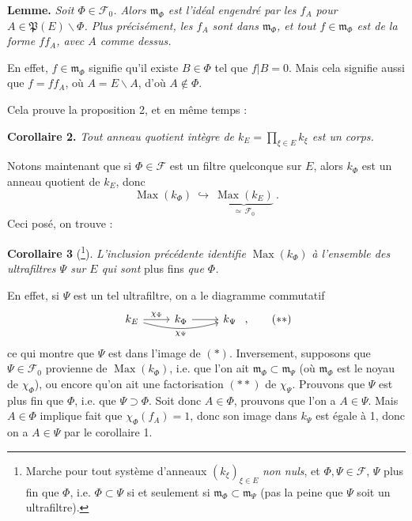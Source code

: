 \documentclass[11pt]{article}
\newcommand{\msp}[1]{\marginpar{\footnotesize [#1]}}
\begin{document}
\textbf{Lemme.} \textit{Soit $\Phi\in\mathcal{F}_0$. Alors $\mathfrak{m}_\Phi$ est l'idéal engendré par les $f_A$ pour $A\in\mathfrak{P}(E)\backslash\Phi$. Plus précisément, les $f_A$ sont dans $\mathfrak{m}_\Phi$, et tout $f\in\mathfrak{m}_\Phi$ est de la forme $ff_A$, avec $A$ comme dessus.}

En effet, $f\in\mathfrak{m}_\Phi$ signifie qu'il existe $B\in\Phi$ tel que $f|B=0$. Mais cela signifie aussi que $f=ff_A$, où $A=E\backslash A$, d'où $A\notin\Phi$.

Cela prouve la proposition 2, et en même temps :

\textbf{Corollaire 2.} \textit{Tout anneau quotient intègre de $k_E=\prod_{\xi\in E}k_\xi$ est un corps.}

Notons maintenant que si $\Phi\in\mathcal{F}$ est un filtre quelconque sur $E$, alors $k_\Phi$ est un anneau quotient de $k_E$, donc
\[
\operatorname{Max}(k_\Phi)\ \hookrightarrow\ \underbrace{\operatorname{Max}(k_E)}_{\simeq\,\mathcal{F}_0}\ . \tag*{$(*)$}
\]
Ceci posé, on trouve :

\textbf{Corollaire 3} (\footnote[206]{Marche pour tout système d'anneaux $(k_\xi)_{\xi\in E}$ \textit{non nuls}, et $\Phi,\Psi\in\mathcal{F}$, $\Psi$ plus fin que $\Phi$, i.e. $\Phi\subset\Psi$ si et seulement si $\mathfrak{m}_\Phi\subset\mathfrak{m}_\Psi$ (pas la peine que $\Psi$ soit un ultrafiltre).}). \textit{L'inclusion précédente identifie} $\operatorname{Max}(k_\Phi)$ \textit{à l'ensemble des ultrafiltres $\Psi$ sur $E$ qui sont} plus fins \textit{que $\Phi$.}

En effet, si $\Psi$ est un tel ultrafiltre, on
\msp{page 8}
a le diagramme commutatif
\[
\begin{tikzcd}
k_E \arrow[r, "\chi_\Phi"] \arrow[rr, bend right=15, "\chi_\Psi"'] & k_\Phi \arrow[r] & k_\Psi
\end{tikzcd}\ , \tag*{$(**)$}
\]
ce qui montre que $\Psi$ est dans l'image de $(*)$. Inversement, supposons que $\Psi\in\mathcal{F}_0$ provienne de $\operatorname{Max}(k_\Phi)$, i.e. que l'on ait $\mathfrak{m}_\Phi\subset\mathfrak{m}_\Psi$ (où $\mathfrak{m}_\Phi$ est le noyau de $\chi_\Phi$), ou encore qu'on ait une factorisation $(**)$ de $\chi_\Psi$. Prouvons que $\Psi$ est plus fin que $\Phi$, i.e. que $\Psi\supset\Phi$. Soit donc $A\in\Phi$, prouvons que l'on a $A\in\Psi$. Mais $A\in\Phi$ implique fait que $\chi_\Phi(f_A)=1$, donc son image dans $k_\Psi$ est égale à 1, donc on a $A\in\Psi$ par le corollaire 1.
\end{document}
